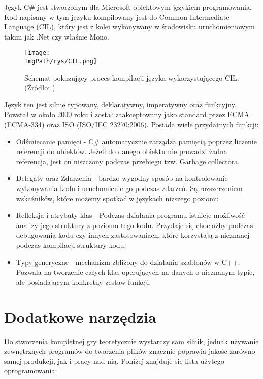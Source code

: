 \documentclass[a4paper,12pt,twoside,openany]{report}
\newcommand{\ImgPath}{.}
\begin{document}
Język C\# jest stworzonym dla Microsoft obiektowym językiem programowania. Kod napisany w tym języku kompilowany jest do Common Intermediate Language (CIL), który jest z kolei wykonywany w środowisku uruchomieniowym  takim jak .Net czy właśnie Mono.  


\begin{figure}[!htbp]
	\begin{center}
\centering
\texttt{[image: \\ImgPath/rys/CIL.png]}
\end{center}
	\caption{Schemat pokazujący proces kompilacji języka wykorzystującego CIL. (Źródło: \cite{CLI_wiki})}
	\label{CIL}
\end{figure}

Język ten jest silnie typowany, deklaratywny, imperatywny oraz funkcyjny. Powstał w około 2000 roku i został zaakceptowany jako standard przez ECMA (ECMA-334) oraz ISO (ISO/IEC 23270:2006). Posiada wiele przydatnych funkcji:
\begin{itemize}
    \item Odśmiecanie pamięci - C\# automatycznie zarządza pamięcią poprzez liczenie referencji do obiektów. Jeżeli do danego obiektu nie prowadzi żadna referencja, jest on niszczony podczas przebiegu tzw. Garbage collectora.
    \item Delegaty oraz Zdarzenia - bardzo wygodny sposób na kontrolowanie wykonywania kodu i uruchomienie go podczas zdarzeń. Są rozszerzeniem wskaźników, które możemy spotkać w językach niższego poziomu.
    \item Refleksja i atrybuty klas - Podczas działania programu istnieje możliwość analizy jego struktury z poziomu tego kodu. Przydaje się chociażby podczas debugowania kodu czy innych zastosowaniach, które korzystają z nieznanej podczas kompilacji struktury kodu.
    \item Typy generyczne - mechanizm zbliżony do działania szablonów w C++. Pozwala na tworzenie całych klas operujących na danych o nieznanym typie, ale posiadającym konkretny zestaw funkcji.
\end{itemize}

\section{Dodatkowe narzędzia}
Do stworzenia kompletnej gry teoretycznie wystarczy sam silnik, jednak używanie zewnętrznych programów do tworzenia plików znacznie poprawia jakość zarówno samej produkcji, jak i pracy nad nią. Poniżej znajduje się lista użytego oprogramowania:
\end{document}
